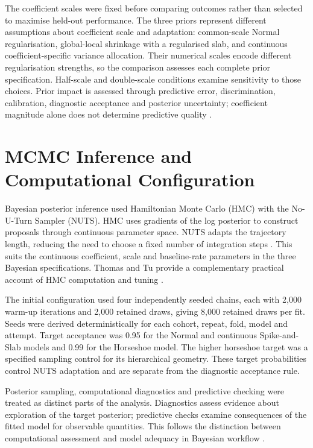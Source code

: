 The coefficient scales were fixed before comparing outcomes rather than selected to maximise held-out performance. The three priors represent different assumptions about coefficient scale and adaptation: common-scale Normal regularisation, global-local shrinkage with a regularised slab, and continuous coefficient-specific variance allocation. Their numerical scales encode different regularisation strengths, so the comparison assesses each complete prior specification. Half-scale and double-scale conditions examine sensitivity to those choices. Prior impact is assessed through predictive error, discrimination, calibration, diagnostic acceptance and posterior uncertainty; coefficient magnitude alone does not determine predictive quality \cite{piironen2017,ref40}.

\section{MCMC Inference and Computational Configuration}\label{mcmc-inference-and-computational-configuration}

Bayesian posterior inference used Hamiltonian Monte Carlo (HMC) with the No-U-Turn Sampler (NUTS). HMC uses gradients of the log posterior to construct proposals through continuous parameter space. NUTS adapts the trajectory length, reducing the need to choose a fixed number of integration steps \cite{hoffman2014}. This suits the continuous coefficient, scale and baseline-rate parameters in the three Bayesian specifications. Thomas and Tu provide a complementary practical account of HMC computation and tuning \cite{ref55}.

The initial configuration used four independently seeded chains, each with 2,000 warm-up iterations and 2,000 retained draws, giving 8,000 retained draws per fit. Seeds were derived deterministically for each cohort, repeat, fold, model and attempt. Target acceptance was 0.95 for the Normal and continuous Spike-and-Slab models and 0.99 for the Horseshoe model. The higher horseshoe target was a specified sampling control for its hierarchical geometry. These target probabilities control NUTS adaptation and are separate from the diagnostic acceptance rule.

Posterior sampling, computational diagnostics and predictive checking were treated as distinct parts of the analysis. Diagnostics assess evidence about exploration of the target posterior; predictive checks examine consequences of the fitted model for observable quantities. This follows the distinction between computational assessment and model adequacy in Bayesian workflow \cite{ref53}.

